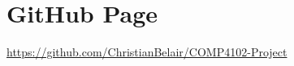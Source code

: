 \section{GitHub Page}

\href{https://github.com/ChristianBelair/COMP4102-Project}{https://github.com/ChristianBelair/COMP4102-Project}